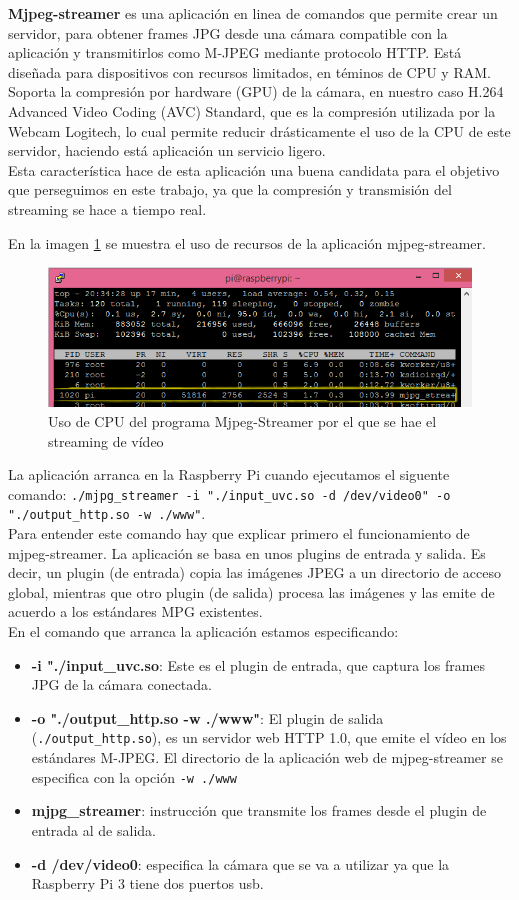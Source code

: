 \documentclass[twoside, 11pt]{epstfg}
\begin{document}
\textbf{Mjpeg-streamer} es una aplicación en linea de comandos que permite crear un servidor, para obtener frames JPG desde una cámara compatible con la aplicación y transmitirlos como M-JPEG mediante protocolo HTTP. Está diseñada para dispositivos con recursos limitados, en téminos de CPU y RAM.\\
Soporta la compresión por hardware (GPU) de la cámara, en nuestro caso H.264 Advanced Video Coding (AVC) Standard, que es la compresión utilizada por la Webcam Logitech, lo cual permite reducir drásticamente el uso de la CPU de este servidor, haciendo está aplicación un servicio ligero.\\
Esta característica hace de esta aplicación una buena candidata para el objetivo que perseguimos en este trabajo, ya que la compresión y transmisión del streaming se hace a tiempo real.

En la imagen \ref{mjpeg} se muestra el uso de recursos de la aplicación mjpeg-streamer.


\begin{figure}[h!]
	\centerline{
		\mbox{\includegraphics[width=.80\textwidth]{images/UsoCPUMjpeg.png}}
	}
	\caption{Uso de CPU del programa Mjpeg-Streamer por el que se hae el streaming de vídeo}
	\label{mjpeg}
\end{figure}

La aplicación arranca en la Raspberry Pi cuando ejecutamos el siguente comando: \texttt{./mjpg\_streamer -i "./input\_uvc.so -d /dev/video0" -o "./output\_http.so -w ./www"}.\\Para entender este comando hay que explicar primero el funcionamiento de mjpeg-streamer. La aplicación se basa en unos plugins de entrada y salida. Es decir, un plugin (de entrada) copia las imágenes JPEG a un directorio de acceso global, mientras que otro plugin (de salida) procesa las imágenes y las emite de acuerdo a los estándares MPG existentes.\\ En el comando que arranca la aplicación estamos especificando:
\begin{itemize}
	\item \textbf{ -i "./input\_uvc.so}: Este es el plugin de entrada, que captura los frames JPG de la cámara conectada.
	\item \textbf{-o "./output\_http.so -w ./www"}: El plugin de salida (\texttt{./output\_http.so}), es un servidor web HTTP 1.0, que emite el vídeo en los estándares M-JPEG. El directorio de la aplicación web de mjpeg-streamer se especifica con la opción \texttt{-w ./www}
	\item \textbf{mjpg\_streamer}: instrucción que transmite los frames desde el plugin de entrada al de salida.
	\item \textbf{-d /dev/video0}: especifica la cámara que se va a utilizar ya que la Raspberry Pi 3 tiene dos puertos usb.
\end{itemize}
\end{document}
